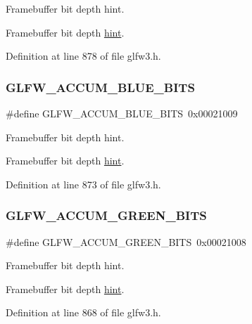 Framebuffer bit depth hint. 

Framebuffer bit depth \mbox{\hyperlink{group__window_gae829b55591c18169a40ab4067a041b1f}{hint}}. 

Definition at line 878 of file glfw3.\+h.

\mbox{\label{group__window_ga22bbe9104a8ce1f8b88fb4f186aa36ce}} 
\subsubsection{\texorpdfstring{GLFW\_ACCUM\_BLUE\_BITS}{GLFW\_ACCUM\_BLUE\_BITS}}
{\footnotesize\ttfamily \#define G\+L\+F\+W\+\_\+\+A\+C\+C\+U\+M\+\_\+\+B\+L\+U\+E\+\_\+\+B\+I\+TS~0x00021009}



Framebuffer bit depth hint. 

Framebuffer bit depth \mbox{\hyperlink{group__window_ga22bbe9104a8ce1f8b88fb4f186aa36ce}{hint}}. 

Definition at line 873 of file glfw3.\+h.

\mbox{\label{group__window_ga65713cee1326f8e9d806fdf93187b471}} 
\subsubsection{\texorpdfstring{GLFW\_ACCUM\_GREEN\_BITS}{GLFW\_ACCUM\_GREEN\_BITS}}
{\footnotesize\ttfamily \#define G\+L\+F\+W\+\_\+\+A\+C\+C\+U\+M\+\_\+\+G\+R\+E\+E\+N\+\_\+\+B\+I\+TS~0x00021008}



Framebuffer bit depth hint. 

Framebuffer bit depth \mbox{\hyperlink{group__window_ga65713cee1326f8e9d806fdf93187b471}{hint}}. 

Definition at line 868 of file glfw3.\+h.

\mbox{\label{group__window_gaead34a9a683b2bc20eecf30ba738bfc6}} 
